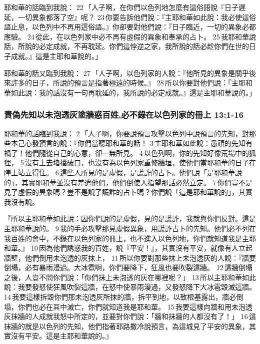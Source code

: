 耶和華的話臨到我說： 22 「人子啊，在你們以色列地怎麼有這俗語說『日子遲延，一切異象都落了空』呢？ 23 你要告訴他們說：『主耶和華如此說：我必使這俗語止息，以色列中不再用這俗語。』你卻要對他們說：『日子臨近，一切的異象必都應驗。 24 從此，在以色列家中必不再有虛假的異象和奉承的占卜。 25 我耶和華說話，所說的必定成就，不再耽延。你們這悖逆之家，我所說的話必趁你們在世的日子成就。』這是主耶和華說的。」

耶和華的話又臨到我說： 27 「人子啊，以色列家的人說：『他所見的異象是關乎後來許多的日子，所說的預言是指著極遠的時候。』 28 所以你要對他們說：『主耶和華如此說：我的話沒有一句再耽延的，我所說的必定成就。』這是主耶和華說的。」

\subsubsection{責偽先知以未泡透灰塗牆惑百姓,必不錄在以色列家的冊上 13:1-16}
耶和華的話臨到我說： 2 「人子啊，你要說預言攻擊以色列中說預言的先知，對那些本己心發預言的說：『你們當聽耶和華的話！ 3 主耶和華如此說：愚頑的先知有禍了！他們隨從自己的心意，卻一無所見。 4 以色列啊，你的先知好像荒場中的狐狸， 5 沒有上去堵擋破口，也沒有為以色列家重修牆垣，使他們當耶和華的日子在陣上站立得住。 6 這些人所見的是虛假，是謊詐的占卜。他們說「是耶和華說的」，其實耶和華並沒有差遣他們，他們倒使人指望那話必然立定。 7 你們豈不是見了虛假的異象嗎？豈不是說了謊詐的占卜嗎？你們說「這是耶和華說的」，其實我沒有說。

『所以主耶和華如此說：因你們說的是虛假，見的是謊詐，我就與你們反對。這是主耶和華說的。 9 我的手必攻擊那見虛假異象，用謊詐占卜的先知。他們必不列在我百姓的會中，不錄在以色列家的冊上，也不進入以色列地，你們就知道我是主耶和華。』 10 因為他們誘惑我的百姓，說『平安！』，其實沒有平安，就像有人立起牆壁，他們倒用未泡透的灰抹上， 11 所以你要對那些抹上未泡透灰的人說：『牆要倒塌，必有暴雨漫過。大冰雹啊，你們要降下，狂風也要吹裂這牆。 12 這牆倒塌之後，人豈不問你們說：「你們抹上未泡透的灰在哪裡呢？」 13 所以主耶和華如此說：我要發怒使狂風吹裂這牆，在怒中使暴雨漫過，又發怒降下大冰雹毀滅這牆。 14 我要這樣拆毀你們那未泡透灰所抹的牆，拆平到地，以致根基露出，牆必倒塌，你們也必在其中滅亡，你們就知道我是耶和華。 15 我要這樣向牆和用未泡透灰抹牆的人成就我怒中所定的，並要對你們說：「牆和抹牆的人都沒有了！」 16 這抹牆的就是以色列的先知，他們指著耶路撒冷說預言，為這城見了平安的異象，其實沒有平安。這是主耶和華說的。』

